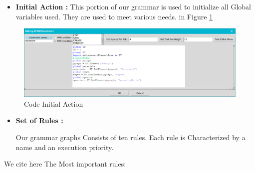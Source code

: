 \begin{itemize}
\item \textbf{Initial Action : } This portion of our grammar is used to initialize all
Global variables used. They are used to meet various needs. in Figure \ref{fig:Code Initial Action} 

\end{itemize}

\begin{figure}[th]
	\centering %
 	\includegraphics[scale=0.38]{ch3/img/InitAct}
	\caption{\label{fig:Code Initial Action}Code Initial Action}
\end{figure} 


\pagebreak
\begin{itemize}
\item \textbf{ Set of Rules : } 
 
Our grammar graphs Consists of ten rules. Each
rule is Characterized by a name and an execution priority. 

\end{itemize}
We cite here The Most important rules: 
